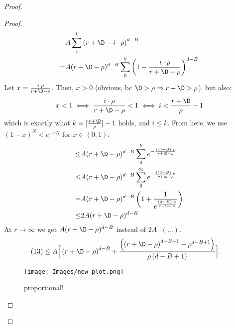 \begin{proof}
\begin{proof}
\begin{align*}
        &A\sum_1^k \left(r+\D-i\cdot \rho\right)^{d-B} \\
        = &A(r+\D-\rho)^{d-B}\sum_0^k \left(1-\frac{i\cdot \rho}{r+\D-\rho}\right)^{d-B} \\
    \end{align*}
    Let $x=\frac{i\cdot \rho}{r+\D-\rho}$. Then, $x>0$ (obvious, bc $\D >\rho\Rightarrow r+\D>\rho$). but also:
    \[
        x<1 \iff \frac{i\cdot \rho}{r+\D-\rho} < 1 \iff i<\frac{r+\D}{\rho}-1
    \]
    which is exactly what $k=[\frac{r+\D}{\rho}]-1$ holds, and $i\leq k$. From here, we use \({(1-x)^N<e^{-xN}}\) for $x\in(0,1)$:
    \begin{align*}
        \leq &A(r+\D-\rho)^{d-B}\sum_0^k e^{-\frac{i(d-B)\cdot \rho}{r+\D-\rho}} \\
        \leq &A(r+\D-\rho)^{d-B}\sum_0^{\infty} e^{-\frac{i(d-B)\cdot \rho}{r+\D-\rho}} \\
        = &A(r+\D-\rho)^{d-B} \left(1+\frac{1}{e^{\frac{(d-B)\cdot \rho}{r+\D-\rho}}}\right)\\
        \leq &2A(r+\D-\rho)^{d-B}
    \end{align*}
    At $r\rightarrow\infty$ we get $A(r+\D-\rho)^{d-B}$ instead of $2A\cdot(\dots)$.
    \begin{align*}
        \left(13\right)&\leq A\Big[\left(r+\D-\rho\right)^{d-B} + \frac{\left(\left(r+\D-\rho\right)^{d-B+1} - \rho^{d-B+1}\right)}{\rho\left(d-B+1\right)}\Big].
    \end{align*}

     \begin{figure}[H]
    \centering
    \texttt{[image: Images/new\_plot.png]}
    \caption{proportional! }
    \label{fig:reflection}
\end{figure}


\end{proof}
\end{proof}
